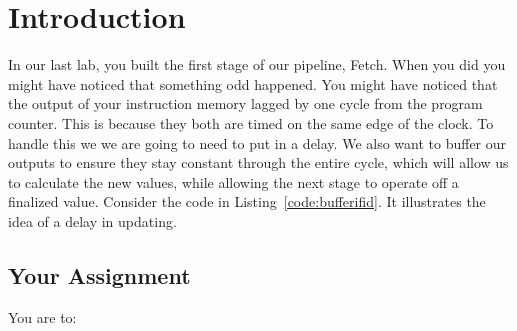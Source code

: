 \chapter{Introduction}

In our last lab, you built the first stage of our pipeline, Fetch.  When you did you might have noticed that something odd happened.  You might have noticed that the output of your instruction memory lagged by one cycle from the program counter.  This is because they both are timed on the same edge of the clock.  To handle this we we are going to need to put in a delay.  We also want to buffer our outputs to ensure they stay constant through the entire cycle, which will allow us to calculate the new values, while allowing the next stage to operate off a finalized value.  Consider the code in Listing~\ref{code:bufferifid}.  It illustrates the idea of a delay in updating.




\section{Your Assignment}

You are to:
